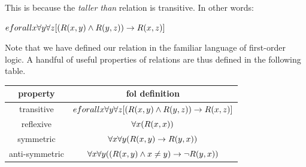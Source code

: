 This is because the \emph{taller than} relation is transitive. In other words:

\begin{example}
  $eforall x\forall y\forall z[(R(x,y)\wedge R(y,z))\rightarrow R(x,z)]$
\end{example}

Note that we have defined our relation in the familiar language of first-order
logic. A handful of useful properties of relations are thus defined in the
following table.

\begin{center}
  \begin{tabular}{c c}
    property & fol definition \\
    \hline
    transitive      &
    $eforall x\forall y\forall z[(R(x,y)\wedge R(y,z))\rightarrow R(x,z)]$\\
    reflexive       &
    $\forall x(R(x,x))$ \\
    symmetric       &
    $\forall x\forall y(R(x,y)\rightarrow R(y,x))$ \\
    anti-symmetric  &
    $\forall x\forall y((R(x,y)\wedge x\neq y)\rightarrow\neg R(y,x))$ \\
  \end{tabular}
\end{center}

